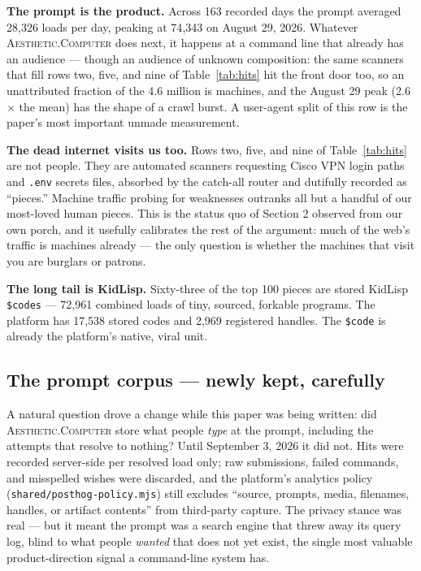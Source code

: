 \documentclass[10pt,letterpaper,twocolumn]{article}
\newcommand{\ac}{\textsc{Aesthetic.Computer}}
\begin{document}
\textbf{The prompt is the product.} Across 163 recorded days the prompt averaged 28{,}326 loads per day, peaking at 74{,}343 on August 29, 2026. Whatever \ac{} does next, it happens at a command line that already has an audience --- though an audience of unknown composition: the same scanners that fill rows two, five, and nine of Table~\ref{tab:hits} hit the front door too, so an unattributed fraction of the 4.6 million is machines, and the August 29 peak (2.6$\times$ the mean) has the shape of a crawl burst. A user-agent split of this row is the paper's most important unmade measurement.

\textbf{The dead internet visits us too.} Rows two, five, and nine of Table~\ref{tab:hits} are not people. They are automated scanners requesting Cisco VPN login paths and \texttt{.env} secrets files, absorbed by the catch-all router and dutifully recorded as ``pieces.'' Machine traffic probing for weaknesses outranks all but a handful of our most-loved human pieces. This is the status quo of Section 2 observed from our own porch, and it usefully calibrates the rest of the argument: much of the web's traffic is machines already --- the only question is whether the machines that visit you are burglars or patrons.

\textbf{The long tail is KidLisp.} Sixty-three of the top 100 pieces are stored KidLisp \texttt{\$codes} --- 72{,}961 combined loads of tiny, sourced, forkable programs. The platform has 17{,}538 stored codes and 2{,}969 registered handles. The \texttt{\$code} is already the platform's native, viral unit.

\subsection{The prompt corpus --- newly kept, carefully}

A natural question drove a change while this paper was being written: did \ac{} store what people \emph{type} at the prompt, including the attempts that resolve to nothing? Until September 3, 2026 it did not. Hits were recorded server-side per resolved load only; raw submissions, failed commands, and misspelled wishes were discarded, and the platform's analytics policy (\texttt{shared/posthog-policy.mjs}) still excludes ``source, prompts, media, filenames, handles, or artifact contents'' from third-party capture. The privacy stance was real --- but it meant the prompt was a search engine that threw away its query log, blind to what people \emph{wanted} that does not yet exist, the single most valuable product-direction signal a command-line system has.
\end{document}
